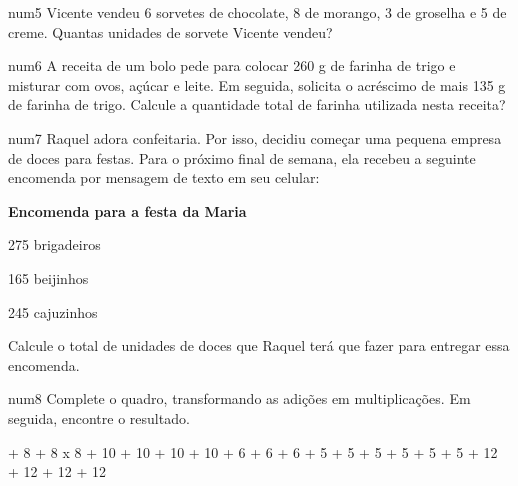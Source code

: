num5 Vicente vendeu 6 sorvetes de chocolate, 8 de morango, 3 de groselha
e 5 de creme. Quantas unidades de sorvete Vicente vendeu?

{}

num6 A receita de um bolo pede para colocar 260 g de farinha de trigo e
misturar com ovos, açúcar e leite. Em seguida, solicita o acréscimo de
mais 135 g de farinha de trigo. Calcule a quantidade total de farinha
utilizada nesta receita?

{}

num7 Raquel adora confeitaria. Por isso, decidiu começar uma pequena
empresa de doces para festas. Para o próximo final de semana, ela
recebeu a seguinte encomenda por mensagem de texto em seu celular:

{\bf Encomenda para a festa da Maria}

\startitemize
\item
  275 brigadeiros
\item
  165 beijinhos
\item
  245 cajuzinhos
\stopitemize

Calcule o total de unidades de doces que Raquel terá que fazer para
entregar essa encomenda.

num8 Complete o quadro, transformando as adições em multiplicações. Em
seguida, encontre o resultado.

\startplacetable[location=none]
\startxtable
\startxtablehead[head]
\startxrow
{} \stopxcell
{} \stopxcell
{} \stopxcell
\stopxrow
\stopxtablehead
\startxtablebody[body]
\startxrow
{} + 8 + 8 \stopxcell
{} x 8 \stopxcell
{} \stopxcell
\stopxrow
\startxrow
{} + 10 + 10 + 10 + 10 \stopxcell
\startxcell[align=right]  \stopxcell
\startxcell[align=right]  \stopxcell
\stopxrow
\startxrow
{} + 6 + 6 + 6 \stopxcell
\startxcell[align=right]  \stopxcell
\startxcell[align=right]  \stopxcell
\stopxrow
\startxrow
{} + 5 + 5 + 5 + 5 + 5 + 5 \stopxcell
\startxcell[align=right]  \stopxcell
\startxcell[align=right]  \stopxcell
\stopxrow
\stopxtablebody
\startxtablefoot[foot]
\startxrow
{} + 12 + 12 + 12 + 12 \stopxcell
\startxcell[align=right]  \stopxcell
\startxcell[align=right]  \stopxcell
\stopxrow
\stopxtablefoot
\stopxtable
\stopplacetable

